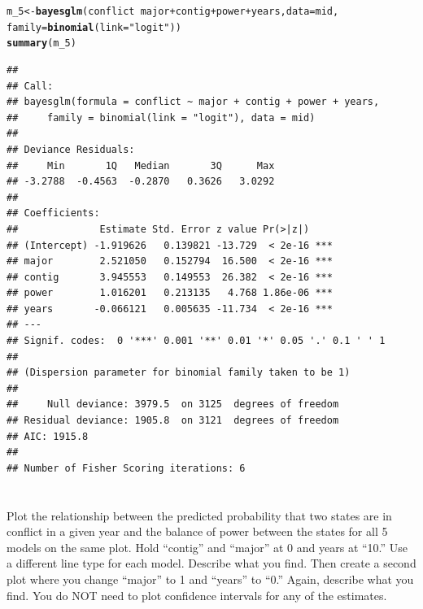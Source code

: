\documentclass{article}\usepackage[]{graphicx}\usepackage[]{color}
\makeatletter
\newcommand{\hlstr}[1]{\textcolor[rgb]{0.192,0.494,0.8}{#1}}%
\newcommand{\hlopt}[1]{\textcolor[rgb]{0,0,0}{#1}}%
\newcommand{\hlstd}[1]{\textcolor[rgb]{0.345,0.345,0.345}{#1}}%
\newcommand{\hlkwb}[1]{\textcolor[rgb]{0.69,0.353,0.396}{#1}}%
\newcommand{\hlkwc}[1]{\textcolor[rgb]{0.333,0.667,0.333}{#1}}%
\newcommand{\hlkwd}[1]{\textcolor[rgb]{0.737,0.353,0.396}{\textbf{#1}}}%
\newenvironment{kframe}{%
 \def\at@end@of@kframe{}%
 \ifinner\ifhmode%
  \def\at@end@of@kframe{\end{minipage}}%
  \begin{minipage}{\columnwidth}%
 \fi\fi%
 \def\FrameCommand##1{\hskip\@totalleftmargin \hskip-\fboxsep
 \colorbox{shadecolor}{##1}\hskip-\fboxsep
     \hskip-\linewidth \hskip-\@totalleftmargin \hskip\columnwidth}%
 \MakeFramed {\advance\hsize-\width
   \@totalleftmargin\z@ \linewidth\hsize
   \@setminipage}}%
 {\par\unskip\endMakeFramed%
 \at@end@of@kframe}
\newenvironment{knitrout}{}{} %
\makeatother
\begin{document}
\begin{knitrout}
\color{fgcolor}\begin{kframe}
\begin{alltt}
\hlstd{m_5} \hlkwb{<-} \hlkwd{bayesglm}\hlstd{(conflict} \hlopt{~} \hlstd{major} \hlopt{+} \hlstd{contig} \hlopt{+} \hlstd{power} \hlopt{+} \hlstd{years,} \hlkwc{data} \hlstd{= mid,}
         \hlkwc{family} \hlstd{=} \hlkwd{binomial}\hlstd{(}\hlkwc{link} \hlstd{=} \hlstr{"logit"}\hlstd{))}
\hlkwd{summary}\hlstd{(m_5)}
\end{alltt}
\begin{verbatim}
## 
## Call:
## bayesglm(formula = conflict ~ major + contig + power + years, 
##     family = binomial(link = "logit"), data = mid)
## 
## Deviance Residuals: 
##     Min       1Q   Median       3Q      Max  
## -3.2788  -0.4563  -0.2870   0.3626   3.0292  
## 
## Coefficients:
##              Estimate Std. Error z value Pr(>|z|)    
## (Intercept) -1.919626   0.139821 -13.729  < 2e-16 ***
## major        2.521050   0.152794  16.500  < 2e-16 ***
## contig       3.945553   0.149553  26.382  < 2e-16 ***
## power        1.016201   0.213135   4.768 1.86e-06 ***
## years       -0.066121   0.005635 -11.734  < 2e-16 ***
## ---
## Signif. codes:  0 '***' 0.001 '**' 0.01 '*' 0.05 '.' 0.1 ' ' 1
## 
## (Dispersion parameter for binomial family taken to be 1)
## 
##     Null deviance: 3979.5  on 3125  degrees of freedom
## Residual deviance: 1905.8  on 3121  degrees of freedom
## AIC: 1915.8
## 
## Number of Fisher Scoring iterations: 6
\end{verbatim}
\end{kframe}
\end{knitrout}

\section{}

Plot the relationship between the predicted probability that two states are in conflict in a given year and the balance of power between the states for all 5 models on the same plot. Hold “contig” and “major” at 0 and years at “10.” Use a different line type for each model. Describe what you find. Then create a second plot where you change “major” to 1 and “years” to “0.” Again, describe what you find. You do NOT need to plot confidence intervals for any of the estimates.
\end{document}
